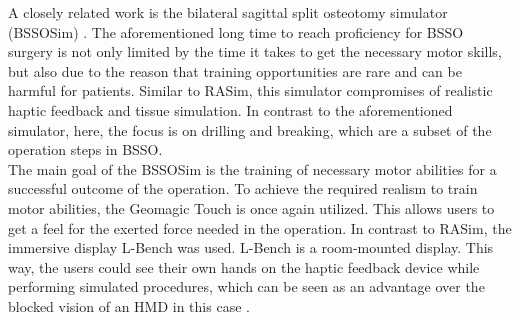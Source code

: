 A closely related work is the bilateral sagittal split osteotomy 
simulator (BSSOSim) \cite{RN69}.
The aforementioned long time to reach proficiency for BSSO surgery
is not only limited by the time it takes to get the necessary motor
skills, but also due to the reason that 
training opportunities are rare and can be harmful for
patients. Similar to RASim, this simulator compromises of 
realistic haptic feedback and tissue simulation.
In contrast to the aforementioned simulator, 
here, the focus is on drilling and breaking, which are a subset of 
the operation steps in BSSO.
\\ The main goal of the BSSOSim is the training of necessary motor 
abilities for a successful
outcome of the operation. To achieve the required realism to train motor 
abilities, the Geomagic Touch is once again utilized.
This allows users to
get a feel for the exerted force needed in the operation. 
In contrast to RASim, the immersive display L-Bench was used.
L-Bench is a room-mounted display. 
This way, the users could see their own hands on the haptic
feedback device while performing simulated procedures,
which can be seen as an advantage over the blocked vision
of an HMD in this case \cite{RN69}.

